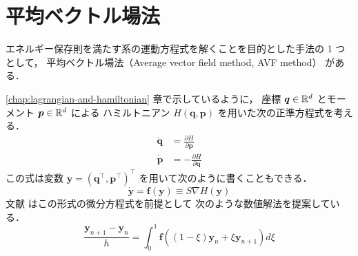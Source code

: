 %

\chapter{平均ベクトル場法}\label{chap:ode_avf}

エネルギー保存則を満たす系の運動方程式を解くことを目的とした手法の 1 つとして，
平均ベクトル場法（Average vector field method, AVF method） \cite{Quispel2008} がある．

\ref{chap:lagrangian-and-hamiltonian} 章で示しているように，
座標 $\bm{q} \in \mathbb{R}^d$ とモーメント $\bm{p} \in \mathbb{R}^d$ による
ハミルトニアン $H(\bm{q}, \bm{p})$ を用いた次の正準方程式を考える．
\begin{align}
    \dot{\bm{q}} & = \frac{\partial H}{\partial \bm{p}}  \\
    \dot{\bm{p}} & = -\frac{\partial H}{\partial \bm{q}}
\end{align}
この式は変数 $\bm{y} = (\bm{q}^\top, \bm{p}^\top)^\top$ を用いて次のように書くこともできる．
\begin{equation}
    \dot{\bm{y}} = \bm{f}(\bm{y}) \equiv S \nabla H(\bm{y})
\end{equation}
文献 \cite{Quispel2008} はこの形式の微分方程式を前提として
次のような数値解法を提案している．
\begin{equation}
    \frac{\bm{y}_{n+1} - \bm{y}_n}{h}
    = \int_{0}^{1} \bm{f}((1 - \xi) \bm{y}_n + \xi \bm{y}_{n+1}) d \xi
    \label{eq:ode_average-vector-field_update-2-order}
\end{equation}

